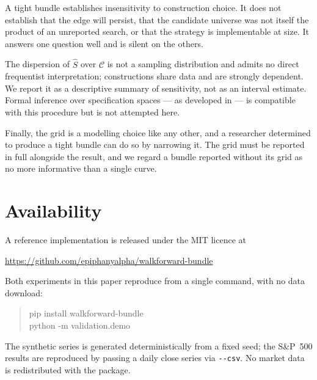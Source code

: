\documentclass[11pt,a4paper]{article}
\begin{document}
A tight bundle establishes insensitivity to construction choice. It does not
establish that the edge will persist, that the candidate universe was not itself
the product of an unreported search, or that the strategy is implementable at
size. It answers one question well and is silent on the others.

The dispersion of $\widehat{S}$ over $\mathcal{C}$ is not a sampling
distribution and admits no direct frequentist interpretation; constructions
share data and are strongly dependent. We report it as a descriptive summary of
sensitivity, not as an interval estimate. Formal inference over specification
spaces --- as developed in \cite{simonsohn2020} --- is compatible with this
procedure but is not attempted here.

Finally, the grid is a modelling choice like any other, and a researcher
determined to produce a tight bundle can do so by narrowing it. The grid must be
reported in full alongside the result, and we regard a bundle reported without
its grid as no more informative than a single curve.

\section{Availability}

A reference implementation is released under the MIT licence at
\begin{center}\small\url{https://github.com/epiphanyalpha/walkforward-bundle}\end{center}
\vspace{-0.4em}
Both experiments in this paper reproduce from a single command, with no data
download:

\begin{quote}\small\ttfamily
pip install walkforward-bundle\\
python -m validation.demo
\end{quote}

The synthetic series is generated deterministically from a fixed seed; the
S\&P~500 results are reproduced by passing a daily close series via
\texttt{-{}-csv}. No market data is redistributed with the package.
\end{document}
